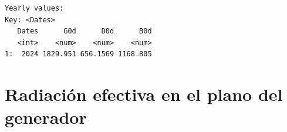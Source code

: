 \begin{itemize}
\begin{verbatim}
Yearly values:
Key: <Dates>
   Dates      G0d      D0d      B0d
   <int>    <num>    <num>    <num>
1:  2024 1829.951 656.1569 1168.805
\end{verbatim}
\end{itemize}

\section{Radiación efectiva en el plano del generador}
\label{sec:org7075610}
